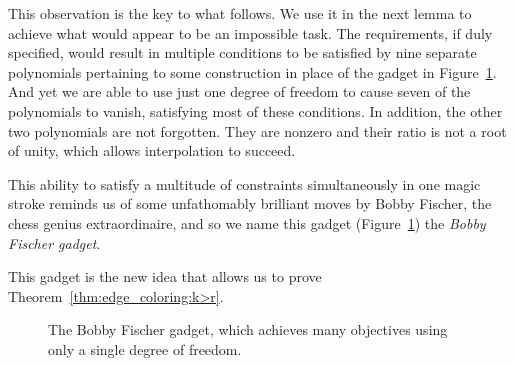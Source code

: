 \documentclass[11pt]{article}
\def\borderColor{blue!60}
\def\scale{0.6}
\def\nodeDist{1.4cm}
\begin{document}
This observation is the key to what follows.
We use it in the next lemma to achieve what would appear to be an impossible task.
The requirements, if duly specified,
would result in multiple conditions to be satisfied by nine separate polynomials pertaining to some construction in place of the gadget in Figure~\ref{fig:gadget:k>r:fischer}.
And yet we are able to use just one degree of freedom to cause seven of the polynomials to vanish,
satisfying most of these conditions.
In addition, the other two polynomials are not forgotten.
They are nonzero and their ratio is not a root of unity,
which allows interpolation to succeed.

This ability to satisfy a multitude of constraints simultaneously in one magic stroke
reminds us of some unfathomably brilliant moves by Bobby Fischer,
the chess genius extraordinaire,
and so we name this gadget (Figure~\ref{fig:gadget:k>r:fischer}) the \emph{Bobby Fischer gadget}.

This gadget is the new idea that allows us to prove Theorem~\ref{thm:edge_coloring:k>r}.

\begin{figure}[t]
 \centering
 \caption{The Bobby Fischer gadget, which achieves many objectives using only a single degree of freedom.}
 \label{fig:gadget:k>r:fischer}
\end{figure}
\end{document}
